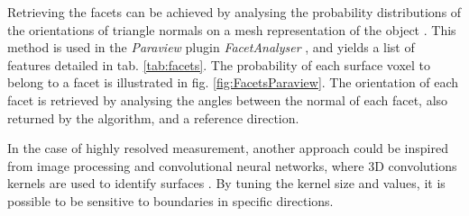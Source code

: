 \begin{table}
    \begin{center}
    \end{center}
    \caption{
    The output of  is a list of values for each facet.
    The accessible features are the facet size, the average strain and displacement (along the [111] direction, for the outermost voxel), and the coordinates of the normal to the facet surface.
    The uncertainty on the average displacement and strain corresponds to the standard deviation of the displacement and strain distribution, respectively.
    }
    \label{tab:facets}
\end{table}{}

Retrieving the facets can be achieved by analysing the probability distributions of the orientations of triangle normals on a mesh representation of the object \parencite{Grothausmann2012}.
This method is used in the \textit{Paraview} plugin \textit{FacetAnalyser} \parencite{Grothausmann2015}, and yields a list of features detailed in tab. \ref{tab:facets}.
The probability of each surface voxel to belong to a facet is illustrated in fig. \ref{fig:FacetsParaview}.
The orientation of each facet is retrieved by analysing the angles between the normal of each facet, also returned by the algorithm, and a reference direction.

In the case of highly resolved measurement, another approach could be inspired from image processing and convolutional neural networks, where 3D convolutions kernels are used to identify surfaces \parencite{RaschkaMirjalili2019}.
By tuning the kernel size and values, it is possible to be sensitive to boundaries in specific directions.


